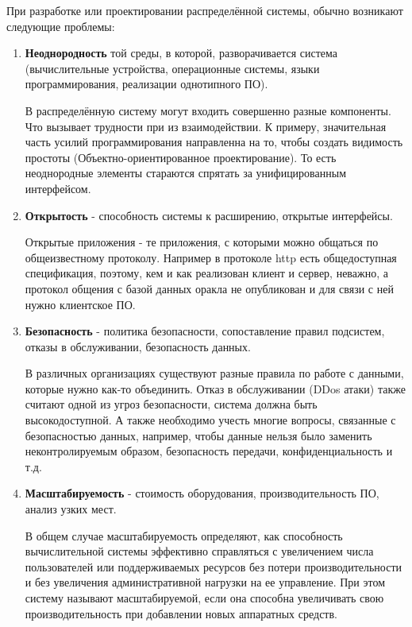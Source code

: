 \noindent При разработке или проектировании распределённой системы, обычно возникают следующие проблемы:
\begin{enumerate}
\setlength\itemsep{0.32em}
\item
\textbf{ Неоднородность} той среды, в которой, разворачивается система (вычислительные устройства, операционные системы, языки программирования, реализации однотипного ПО). 

В распределённую систему могут входить совершенно разные компоненты. Что вызывает трудности при из взаимодействии.
К примеру, значительная часть усилий программирования направленна на то, чтобы создать видимость простоты (Объектно-ориентированное проектирование).
То есть неоднородные элементы стараются спрятать за унифицированным интерфейсом.

\item
\textbf{ Открытость} - способность системы к расширению, открытые интерфейсы. 

Открытые приложения - те приложения, с которыми можно общаться по общеизвестному протоколу. Например в протоколе http есть общедоступная спецификация, поэтому, кем и как реализован клиент и сервер, неважно, а протокол общения с базой данных оракла не опубликован и для связи с ней нужно клиентское ПО.

\item
\textbf{ Безопасность} - политика безопасности, сопоставление правил подсистем, отказы в обслуживании, безопасность данных.

В различных организациях существуют разные правила по работе с данными, которые нужно как-то объединить. 
Отказ в обслуживании (DDos атаки) также считают одной из угроз безопасности, система должна быть высокодоступной. 
А также необходимо учесть многие вопросы, связанные с безопасностью данных, например, чтобы данные нельзя было заменить неконтролируемым образом, безопасность передачи, конфиденциальность и т.д.

\item
\textbf{ Масштабируемость} - стоимость оборудования, производительность ПО, анализ узких мест.

В общем случае масштабируемость определяют, как способность вычислительной системы эффективно справляться с увеличением числа пользователей или поддерживаемых ресурсов без потери производительности и без увеличения административной нагрузки на ее управление. При этом систему называют масштабируемой, если она способна увеличивать свою производительность при добавлении новых аппаратных средств.  


\end{enumerate}
